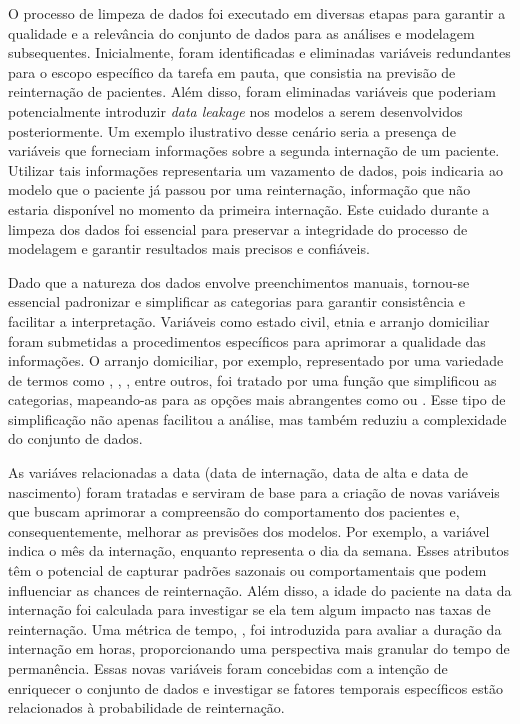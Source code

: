 O processo de limpeza de dados foi executado em diversas etapas para garantir a qualidade e a relevância do conjunto de dados para as análises e modelagem subsequentes. Inicialmente, foram identificadas e eliminadas variáveis redundantes para o escopo específico da tarefa em pauta, que consistia na previsão de reinternação de pacientes. Além disso, foram eliminadas variáveis que poderiam potencialmente introduzir \textit{data leakage} nos modelos a serem desenvolvidos posteriormente. Um exemplo ilustrativo desse cenário seria a presença de variáveis que forneciam informações sobre a segunda internação de um paciente. Utilizar tais informações representaria um vazamento de dados, pois indicaria ao modelo que o paciente já passou por uma reinternação, informação que não estaria disponível no momento da primeira internação. Este cuidado durante a limpeza dos dados foi essencial para preservar a integridade do processo de modelagem e garantir resultados mais precisos e confiáveis.

Dado que a natureza dos dados envolve preenchimentos manuais, tornou-se essencial padronizar e simplificar as categorias para garantir consistência e facilitar a interpretação. Variáveis como estado civil, etnia e arranjo domiciliar foram submetidas a procedimentos específicos para aprimorar a qualidade das informações. O arranjo domiciliar, por exemplo, representado por uma variedade de termos como , , , entre outros, foi tratado por uma função que simplificou as categorias, mapeando-as para as opções mais abrangentes como  ou . Esse tipo de simplificação não apenas facilitou a análise, mas também reduziu a complexidade do conjunto de dados.

As variáves relacionadas a data (data de internação, data de alta e data de nascimento) foram tratadas e serviram de base para a criação de novas variáveis que buscam aprimorar a compreensão do comportamento dos pacientes e, consequentemente, melhorar as previsões dos modelos. Por exemplo, a variável  indica o mês da internação, enquanto  representa o dia da semana. Esses atributos têm o potencial de capturar padrões sazonais ou comportamentais que podem influenciar as chances de reinternação. Além disso, a idade do paciente na data da internação foi calculada para investigar se ela tem algum impacto nas taxas de reinternação. Uma métrica de tempo, , foi introduzida para avaliar a duração da internação em horas, proporcionando uma perspectiva mais granular do tempo de permanência. Essas novas variáveis foram concebidas com a intenção de enriquecer o conjunto de dados e investigar se fatores temporais específicos estão relacionados à probabilidade de reinternação.

